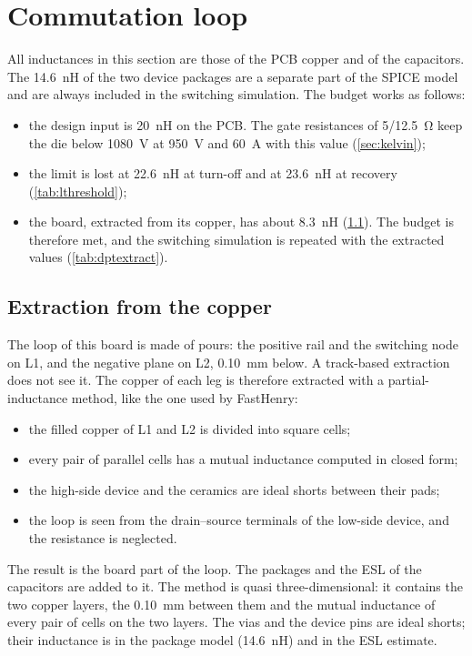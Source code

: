 \section{Commutation loop}

All inductances in this section are those of the PCB copper and of the
capacitors. The \SI{14.6}{\nano\henry} of the two device packages are a
separate part of the SPICE model and are always included in the switching
simulation. The budget works as follows:
\begin{itemize}
  \item the design input is \SI{20}{\nano\henry} on the PCB. The gate
        resistances of \SI{5}{}/\SI{12.5}{\ohm} keep the die below
        \SI{1080}{\volt} at \SI{950}{\volt} and \SI{60}{\ampere} with this
        value (\cref{sec:kelvin});
  \item the limit is lost at \SI{22.6}{\nano\henry} at turn-off and at
        \SI{23.6}{\nano\henry} at recovery (\cref{tab:lthreshold});
  \item the board, extracted from its copper, has about
        \SI{8.3}{\nano\henry} (\cref{sec:loopextract}). The budget is
        therefore met, and the switching simulation is repeated with the
        extracted values (\cref{tab:dptextract}).
\end{itemize}

\subsection{Extraction from the copper}
\label{sec:loopextract}

The loop of this board is made of pours: the positive rail and the switching
node on L1, and the negative plane on L2, \SI{0.10}{\milli\metre} below. A
track-based extraction does not see it. The copper of each leg is therefore
extracted with a partial-inductance method, like the one used by FastHenry:
\begin{itemize}
  \item the filled copper of L1 and L2 is divided into square cells;
  \item every pair of parallel cells has a mutual inductance computed in
        closed form;
  \item the high-side device and the ceramics are ideal shorts between their
        pads;
  \item the loop is seen from the drain--source terminals of the low-side
        device, and the resistance is neglected.
\end{itemize}
The result is the board part of the loop. The packages and the ESL of the
capacitors are added to it. The method is quasi three-dimensional: it
contains the two copper layers, the \SI{0.10}{\milli\metre} between them
and the mutual inductance of every pair of cells on the two layers. The vias
and the device pins are ideal shorts; their inductance is in the package
model (\SI{14.6}{\nano\henry}) and in the ESL estimate.

